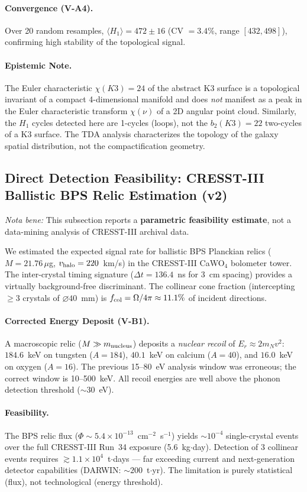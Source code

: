 \paragraph{Convergence (V-A4).} Over 20 random resamples, $\langle H_1 \rangle = 472 \pm 16$ (CV $= 3.4\%$, range $[432, 498]$), confirming high stability of the topological signal.

\paragraph{Epistemic Note.} The Euler characteristic $\chi(K3) = 24$ of the abstract K3 surface is a topological invariant of a compact 4-dimensional manifold and does \emph{not} manifest as a peak in the Euler characteristic transform $\chi(\nu)$ of a 2D angular point cloud. Similarly, the $H_1$ cycles detected here are 1-cycles (loops), not the $b_2(K3) = 22$ two-cycles of a K3 surface. The TDA analysis characterizes the topology of the galaxy spatial distribution, not the compactification geometry.

\subsection{Direct Detection Feasibility: CRESST-III Ballistic BPS Relic Estimation (v2)}
\label{subsec:cresst}

\emph{Nota bene:} This subsection reports a \textbf{parametric feasibility estimate}, not a data-mining analysis of CRESST-III archival data.

We estimated the expected signal rate for ballistic BPS Planckian relics ($M = 21.76\,\mu$g, $v_{\rm halo} = 220$~km/s) in the CRESST-III CaWO$_4$ bolometer tower. The inter-crystal timing signature ($\Delta t = 136.4$~ns for 3~cm spacing) provides a virtually background-free discriminant. The collinear cone fraction (intercepting $\geq 3$ crystals of $\varnothing 40$~mm) is $f_{\rm col} = \Omega / 4\pi \approx 11.1\%$ of incident directions.

\paragraph{Corrected Energy Deposit (V-B1).} A macroscopic relic ($M \gg m_{\rm nucleus}$) deposits a \emph{nuclear recoil} of $E_r \approx 2 m_N v^2$: $184.6$~keV on tungsten ($A=184$), $40.1$~keV on calcium ($A=40$), and $16.0$~keV on oxygen ($A=16$). The previous 15--80~eV analysis window was erroneous; the correct window is 10--500~keV. All recoil energies are well above the phonon detection threshold ($\sim 30$~eV).

\paragraph{Feasibility.} The BPS relic flux ($\Phi \sim 5.4 \times 10^{-13}$~cm$^{-2}$~s$^{-1}$) yields $\sim 10^{-4}$ single-crystal events over the full CRESST-III Run~34 exposure (5.6~kg$\cdot$day). Detection of 3 collinear events requires $\gtrsim 1.1 \times 10^4$~t$\cdot$days --- far exceeding current and next-generation detector capabilities (DARWIN: $\sim 200$~t$\cdot$yr). The limitation is purely statistical (flux), not technological (energy threshold).
